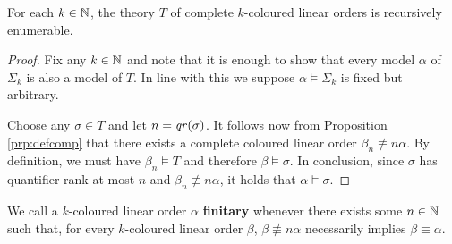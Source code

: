 \begin{prp}
	For each $k\in\nats$, the theory $T$ of complete $k$-coloured linear orders is recursively enumerable.
\end{prp}
\begin{proof}
	Fix any $k\in\nats$ and note that it is enough to show that every model $\alpha$ of $\Sigma_k$ is also a model of $T$.  In line with this we suppose $\alpha\models\Sigma_k$ is fixed but arbitrary.

	Choose any $\sigma\in T$ and let $n=\mathit{qr}(\sigma)$.  It follows now from Proposition \ref{prp:defcomp} that there exists a complete coloured linear order $\beta_n\nequiv{n}\alpha$.  By definition, we must have $\beta_n\models T$ and therefore $\beta\models\sigma$.  In conclusion, since $\sigma$ has quantifier rank at most $n$ and $\beta_n\nequiv{n}\alpha$, it holds that $\alpha\models\sigma$.
\end{proof}


\iffalse
\begin{dfn}[regularity]
	We call a $k$-coloured linear order $\alpha$, with colours say $r_0,\dotsc,r_{k-1}$, \textbf{regular} whenever \textit{a subset of} its colours form a partition of $\alpha$ and no member of $\alpha$ posesses two distinct colours.  Equivalently, $\alpha$ is regular whenever it holds that:
	\begin{equation}
		\alpha\models\left(\forall x\bigvee_{0\leq i<n}r_i(x)\right)\wedge\left(\neg\exists x\bigvee_{i<j<k}(r_i(x)\wedge r_j(x))\right).
	\end{equation}
\end{dfn}

\begin{dfn}[$k$-Pattern]
	A $k$-coloured linear order $\alpha$ is called a $\bm{k}$\textbf{-pattern} whenever $\alpha$ is both regular and finite.  Should $k\in\nats$ be clear from the context we will refer to $\alpha$ as simply being a \textit{pattern}.
\end{dfn}
\fi

\begin{dfn}[Finitary]
	We call a $k$-coloured linear order $\alpha$ \textbf{finitary} whenever there exists some $n\in\mathbb{N}$ such that, for every $k$-coloured linear order $\beta$, $\beta\nequiv{n}\alpha$ necessarily implies $\beta\equiv\alpha$.
\end{dfn}

